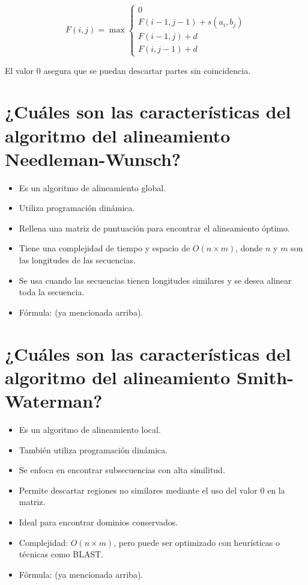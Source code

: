 \documentclass[fleqn,10pt]{article}
\begin{document}
\[
F(i,j) = \max \begin{cases}
0 \\
F(i-1, j-1) + s(a_i, b_j) \\
F(i-1, j) + d \\
F(i, j-1) + d
\end{cases}
\]

El valor $0$ asegura que se puedan descartar partes sin coincidencia.

\section{¿Cuáles son las características del algoritmo del alineamiento Needleman-Wunsch?}
\begin{itemize}
    \item Es un algoritmo de alineamiento global.
    \item Utiliza programación dinámica.
    \item Rellena una matriz de puntuación para encontrar el alineamiento óptimo.
    \item Tiene una complejidad de tiempo y espacio de $O(n \times m)$, donde $n$ y $m$ son las longitudes de las secuencias.
    \item Se usa cuando las secuencias tienen longitudes similares y se desea alinear toda la secuencia.
    \item Fórmula: (ya mencionada arriba).
\end{itemize}

\section{¿Cuáles son las características del algoritmo del alineamiento Smith-Waterman?}
\begin{itemize}
    \item Es un algoritmo de alineamiento local.
    \item También utiliza programación dinámica.
    \item Se enfoca en encontrar subsecuencias con alta similitud.
    \item Permite descartar regiones no similares mediante el uso del valor $0$ en la matriz.
    \item Ideal para encontrar dominios conservados.
    \item Complejidad: $O(n \times m)$, pero puede ser optimizado con heurísticas o técnicas como BLAST.
    \item Fórmula: (ya mencionada arriba).
\end{itemize}
\end{document}
